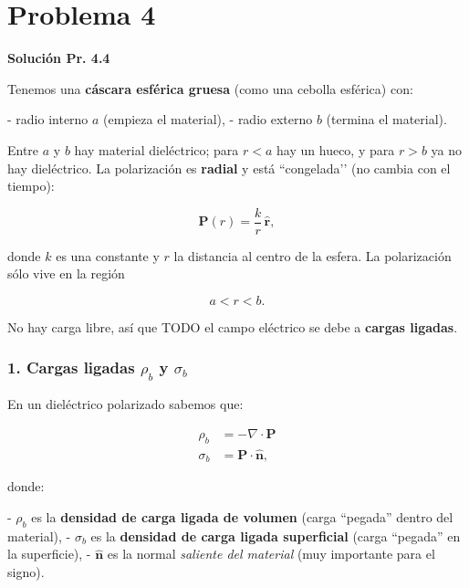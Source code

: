 \documentclass{article}
\begin{document}
\section{Problema 4}

\textcolor{Cinnabar}{\textbf{Solución Pr. 4.4}} \vspace{0.4cm}

Tenemos una \textbf{cáscara esférica gruesa} (como una cebolla esférica) con:

- radio interno $a$ (empieza el material),  
- radio externo $b$ (termina el material).

Entre $a$ y $b$ hay material dieléctrico; para $r<a$ hay un hueco, y para
$r>b$ ya no hay dieléctrico.  
La polarización es \textbf{radial} y está “congelada’’ (no cambia con el
tiempo):

\begin{equation}
\mathbf{P}(r) = \frac{k}{r}\,\hat{\mathbf{r}},
\label{eq:P-shell}
\end{equation}

donde $k$ es una constante y $r$ la distancia al centro de la esfera.  
La polarización sólo vive en la región

\[
a<r<b.
\]

No hay carga libre, así que TODO el campo eléctrico se debe a \textbf{cargas
ligadas}.

\subsubsection*{1. Cargas ligadas $\rho_{b}$ y $\sigma_{b}$}

En un dieléctrico polarizado sabemos que:

\begin{align}
\rho_{b} &= - \nabla\cdot\mathbf{P}
\label{eq:rho-b-def-shell} \\
\sigma_{b} &= \mathbf{P}\cdot\hat{\mathbf{n}},
\label{eq:sigma-b-def-shell}
\end{align}

donde:

- $\rho_{b}$ es la \textbf{densidad de carga ligada de volumen}
  (carga “pegada” dentro del material),
- $\sigma_{b}$ es la \textbf{densidad de carga ligada superficial}
  (carga “pegada” en la superficie),
- $\hat{\mathbf{n}}$ es la normal \emph{saliente del material}
  (muy importante para el signo).
\end{document}
